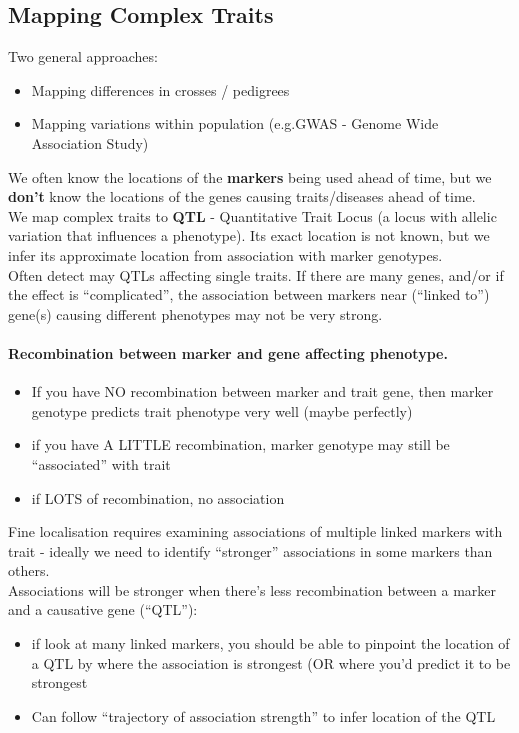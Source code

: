 \documentclass{scrartcl}
\begin{document}
\subsection{Mapping Complex Traits}
\label{sec:4-4}
Two general approaches:
\begin{itemize}
\item Mapping differences in crosses / pedigrees
\item Mapping variations within population (e.g.GWAS - Genome Wide Association Study)
\end{itemize}
We often know the locations of the {\bf markers} being used ahead of time, but we {\bf don't} know the locations of the genes causing traits/diseases ahead of time.\\
We map complex traits to {\bf QTL} - Quantitative Trait Locus (a locus with allelic variation that influences a phenotype).
Its exact location is not known, but we infer its approximate location from association with marker genotypes.\\
Often detect may QTLs affecting single traits.
If there are many genes, and/or if the effect is ``complicated'', the association between markers near (``linked to'') gene(s) causing different phenotypes may not be very strong.

\paragraph{Recombination between marker and gene affecting phenotype.}
\begin{itemize}
\item If you have NO recombination between marker and trait gene, then marker genotype predicts trait phenotype very well (maybe perfectly)
\item if you have A LITTLE recombination, marker genotype may still be ``associated'' with trait
\item if LOTS of recombination, no association
\end{itemize}
Fine localisation requires examining associations of multiple linked markers with trait - ideally we need to identify ``stronger'' associations in some markers than others. \\
Associations will be stronger when there's less recombination between a marker and a causative gene (``QTL''):
\begin{itemize}
\item if look at many linked markers, you should be able to pinpoint the location of a QTL by where the association is strongest (OR where you'd predict it to be strongest
\item Can follow ``trajectory of association strength'' to infer location of the QTL
\end{itemize}
\end{document}
